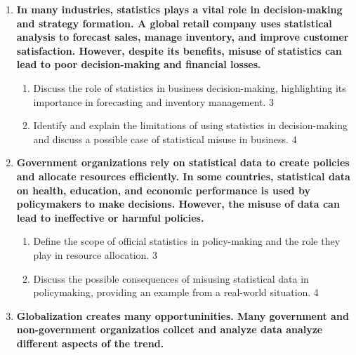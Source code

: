 \documentclass[a4paper,oneside]{book}
\begin{document}
\begin{enumerate}
\begin{enumerate}
  \begin{enumerate}
    \item
	What is data? \hfill 1
    \item
	How is statistics important in planning?\hfill 2
    \item  
	Differentiate between official and non-official statistics. \hfill 3
    \item
	Elucidate the classification of published statistics in Bangladesh.  \hfill 4
  \end{enumerate}
  
  \item
\textbf{In many industries, statistics plays a vital role in decision-making 
and strategy formation. A global retail company uses statistical analysis to 
forecast sales, manage inventory, and improve customer satisfaction. 
However, despite its benefits, misuse of statistics can lead to poor 
decision-making and financial losses.}

\begin{enumerate}
    \item  
    Discuss the role of statistics in business decision-making, highlighting 
    its importance in forecasting and inventory management. \hfill 3
    \item
    Identify and explain the limitations of using statistics in 
    decision-making and discuss a possible case of statistical misuse 
    in business. \hfill 4
\end{enumerate}

\item
\textbf{Government organizations rely on statistical data to create policies 
and allocate resources efficiently. In some countries, statistical data on 
health, education, and economic performance is used by policymakers to make 
decisions. However, the misuse of data can lead to ineffective or 
harmful policies.}

\begin{enumerate}
    \item  
    Define the scope of official statistics in policy-making and the role 
    they play in resource allocation. \hfill 3
    \item
    Discuss the possible consequences of misusing statistical data in 
    policymaking, providing an example from a real-world situation. \hfill 4
\end{enumerate}


   \item
	  \textbf{Globalization creates many opportuninities. Many government and non-government organizatios collcet and analyze data analyze different aspects of the trend.} 
  

\end{enumerate}
\end{enumerate}
\end{document}
